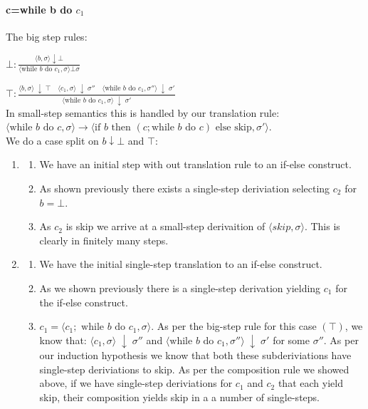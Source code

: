 \paragraph{c=while b do $c_1$}
The big step rules:

$\bot: \frac{\langle b, \sigma\rangle \downarrow \bot}{\langle \text{while } b \text{ do } c_1, \sigma \rangle \bot \sigma }$

$\top:\frac{
  \langle b, \sigma \rangle \;\downarrow\; \top
  \quad
  \langle c_1, \sigma \rangle \;\downarrow\; \sigma''
  \quad
  \langle \text{while } b \text{ do } c_1, \sigma'' \rangle \;\downarrow\; \sigma'
}{
  \langle \text{while } b \text{ do } c_1, \sigma \rangle \;\downarrow\; \sigma'
}$\\
In small-step semantics this is handled by our translation rule: $\langle \text{while } b \text{ do } c, \sigma \rangle \rightarrow \langle \text{if } b \text{ then } (c;\text{while } b \text{ do } c) \text{ else skip}, \sigma' \rangle $. \\
We do a case split on $b \downarrow \bot$ and $\top$:


\begin{enumerate}
    \item[\textbf{Case $\bot$}]
    \begin{enumerate}
        \item We have an initial step with out translation rule to an if-else construct.
        \item As shown previously there exists a single-step deriviation selecting $c_2$ for $b=\bot$.
        \item As $c_2$ is skip we arrive at a small-step derivaition of $\langle skip, \sigma \rangle$. This is clearly in finitely many steps.
    \end{enumerate}
    \item [\textbf{Case $\top$}]
    \begin{enumerate}
        \item We have the initial single-step translation to an if-else construct.
        \item As we shown previously there is a single-step derivation yielding $c_1$ for the if-else construct.
        \item $c_1=\langle c_1; \text{ while } b\text{ do }c_1, \sigma \rangle$. As per the big-step rule for this case $(\top)$, we know that: $ \langle c_1, \sigma \rangle \;\downarrow\; \sigma''$ and $
  \langle \text{while } b \text{ do } c_1, \sigma'' \rangle \;\downarrow\; \sigma'$ for some $\sigma''$. As per our induction hypothesis we know that both these subderiviations have single-step deriviations to skip. As per the composition rule we showed above, if we have single-step deriviations for $c_1$ and $c_2$ that each yield skip, their composition yields skip in a a number of single-steps. 
    \end{enumerate}
\end{enumerate}
